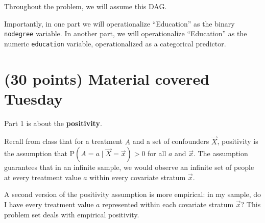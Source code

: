 \documentclass[10pt]{article}
\renewcommand{\P}{\text{P}}
\begin{document}
Throughout the problem, we will assume this DAG.

\begin{center}
\end{center}
Importantly, in one part we will operationalize ``Education'' as the binary \texttt{nodegree} variable. In another part, we will operationalize ``Education'' as the numeric \texttt{education} variable, operationalized as a categorical predictor.

\clearpage

\section{(30 points) Material covered Tuesday}
Part 1 is about the \textbf{positivity}.

Recall from class that for a treatment $A$ and a set of confounders $\vec{X}$, positivity is the assumption that $\P(A = a\mid \vec{X} = \vec{x}) > 0$ for all $a$ and $\vec{x}$. The assumption guarantees that in an infinite sample, we would observe an infinite set of people at every treatment value $a$ within every covariate stratum $\vec{x}$.

A second version of the positivity assumption is more empirical: in my sample, do I have every treatment value $a$ represented within each covariate stratum $\vec{x}$? This problem set deals with empirical positivity.
\end{document}
